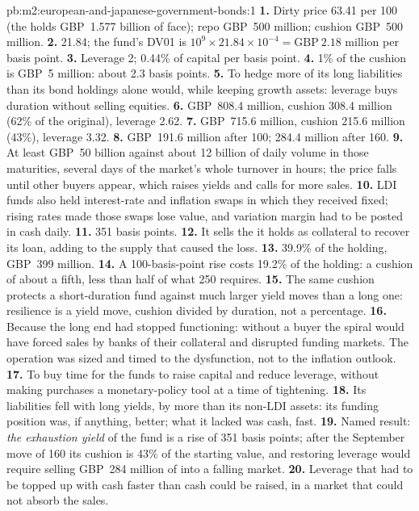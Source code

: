 \begin{solution}{pb:m2:european-and-japanese-government-bonds:1}
\textbf{1.} Dirty price 63.41 per 100 (the  holds GBP~1.577 billion of face);
repo GBP~500 million; cushion GBP~500 million.
\textbf{2.}  21.84; the fund's DV01 is $10^9 \times 21.84 \times
10^{-4} = \text{GBP}~2.18$ million per basis point.
\textbf{3.} Leverage 2; 0.44\% of capital per basis point.
\textbf{4.} 1\% of the cushion is GBP~5 million: about 2.3 basis points.
\textbf{5.} To hedge more of its long liabilities than its bond holdings alone
would, while keeping growth assets: leverage buys duration without selling
equities.
\textbf{6.}  GBP~808.4 million, cushion 308.4 million (62\% of the
original), leverage 2.62.
\textbf{7.}  GBP~715.6 million, cushion 215.6 million (43\%), leverage 3.32.
\textbf{8.} GBP~191.6 million after 100; 284.4 million after 160.
\textbf{9.} At least GBP~50 billion against about 12 billion of daily volume in
those maturities, several days of the market's whole turnover in hours; the
price falls until other buyers appear, which raises yields and calls for more
sales.
\textbf{10.} LDI funds also held interest-rate and inflation swaps in which
they received fixed; rising rates made those swaps lose value, and
variation margin had to be posted in cash daily.
\textbf{11.} 351 basis points.
\textbf{12.} It sells the  it holds as collateral to recover its loan,
adding to the supply that caused the loss.
\textbf{13.} 39.9\% of the holding, GBP~399 million.
\textbf{14.} A 100-basis-point rise costs 19.2\% of the holding: a cushion of
about a fifth, less than half of what 250 requires.
\textbf{15.} The same cushion protects a short-duration fund against much larger
yield moves than a long one: resilience is a yield move, cushion divided by
duration, not a percentage.
\textbf{16.} Because the long end had stopped functioning: without a buyer
the spiral would have forced sales by banks of their collateral and disrupted
funding markets. The operation was sized and timed to the dysfunction, not to
the inflation outlook.
\textbf{17.} To buy time for the funds to raise capital and reduce leverage,
without making purchases a monetary-policy tool at a time of tightening.
\textbf{18.} Its liabilities fell with long yields, by more than its non-LDI
assets: its funding position was, if anything, better; what it lacked was
cash, fast.
\textbf{19.} Named result: \emph{the exhaustion yield} of the fund is a rise of 351
basis points; after the September move of 160 its cushion is 43\% of the
starting value, and restoring leverage would require selling GBP~284 million of
 into a falling market.
\textbf{20.} Leverage that had to be topped up with cash faster than cash could
be raised, in a market that could not absorb the sales.
\end{solution}

